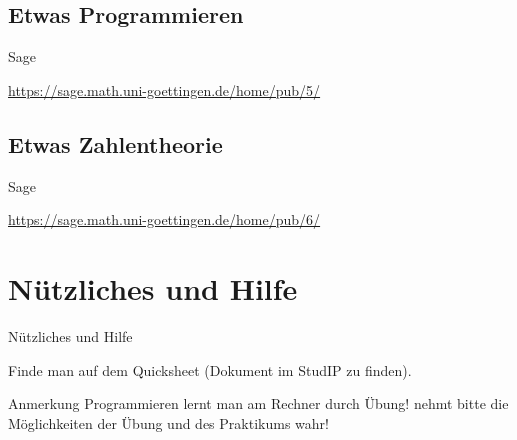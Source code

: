 \documentclass[hyperref={xetex}]{beamer}
\begin{document}
%
%


\subsection{Etwas Programmieren}
\begin{frame}[fragile]{Sage}
\begin{center}
\url{https://sage.math.uni-goettingen.de/home/pub/5/}
\end{center}
\end{frame}


\subsection{Etwas Zahlentheorie}
\begin{frame}[fragile]{Sage}
\begin{center}
\url{https://sage.math.uni-goettingen.de/home/pub/6/}
\end{center}
\end{frame}

\section{Nützliches und Hilfe}
\begin{frame}[fragile]{Nützliches und Hilfe}
\begin{center}
Finde man auf dem \alert{Quicksheet} (Dokument im StudIP zu finden).
\end{center}

\begin{block}{Anmerkung}
Programmieren lernt man am Rechner durch Übung! nehmt bitte die Möglichkeiten 
der Übung und des Praktikums wahr!
\end{block}
\end{frame}
\end{document}
